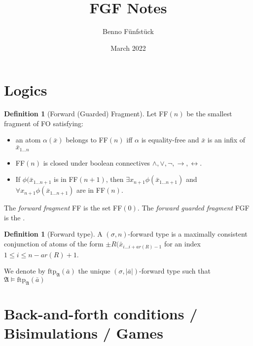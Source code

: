 \documentclass[draft]{scrartcl}
\title{FGF Notes}
\author{Benno Fünfstück}
\date{March 2022}
\theoremstyle{definition}
\newtheorem{definition}[theorem]{Definition}
\begin{document}
\maketitle

\section{Logics}

\begin{definition}[Forward (Guarded) Fragment]
Let FF$(n)$ be the smallest fragment of FO satisfying:

\begin{itemize}
    \item an atom $\alpha(\bar{x})$ belongs to FF$(n)$ iff $\alpha$ is equality-free and $\bar{x}$ is an infix of $\bar{x}_{1\ldots{}n}$
    \item FF$(n)$ is closed under boolean connectives $\land, \lor, \neg, \rightarrow, \leftrightarrow$.
    \item If $\phi(\bar{x}_{1\ldots{}n+1}$ is in FF$(n+1)$, then $\exists{x_{n+1}}\phi(\bar{x}_{1\ldots{}n+1})$ and $\forall{x_{n+1}}\phi(\bar{x}_{1\ldots{}n+1})$ are in FF$(n)$.
\end{itemize}

The \emph{forward fragment} FF is the set FF$(0)$.
The \emph{forward guarded fragment} FGF is the .
\end{definition}

\begin{definition}[Forward type]
A $(\sigma,n)$-forward type is a maximally consistent conjunction of atoms of the form $\pm{}R(\bar{x}_{i\ldots{}i+ar(R)-1}$ for an index $1 \leq i \leq n - ar(R) + 1$.
\end{definition}

We denote by $\mathrm{ftp}_\mathfrak{A}(\bar{a})$ the unique $(\sigma,|\bar{a}|)$-forward type such that $\mathfrak{A} \models \mathrm{ftp}_\mathfrak{A}(\bar{a})$

\section{Back-and-forth conditions / Bisimulations / Games}
\end{document}
